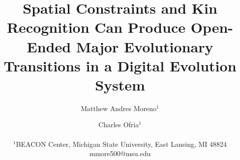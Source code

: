 \documentclass[letterpaper]{article}
\title{Spatial Constraints and Kin Recognition Can Produce Open-Ended Major Evolutionary Transitions in a Digital Evolution System}
\author{Matthew Andres Moreno$^{1}$ \and Charles Ofria$^{1}$ \\
\mbox{}\\
$^1$BEACON Center, Michigan State University, East Lansing, MI 48824 \\
mmore500@msu.edu} %
\begin{document}
\maketitle













\footnotesize


\clearpage
\newpage

\appendix


\end{document}

